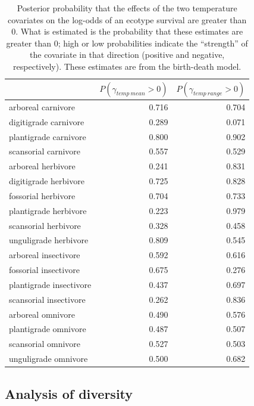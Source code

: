 \documentclass[12pt,letterpaper]{article}
\begin{document}
\begin{table}[ht]
  \centering
  \caption[Posterior probablity of effects of temperature on survival]{Posterior probability that the effects of the two temperature covariates on the log-odds of an ecotype survival are greater than 0. What is estimated is the probability that these estimates are greater than 0; high or low probabilities indicate the ``strength'' of the covariate in that direction (positive and negative, respectively). These estimates are from the birth-death model.}
  \label{tab:surv_temp}
  \begin{tabular}{ l r r }
    \hline
    & \(P(\gamma_{temp\ mean} > 0)\) & \(P(\gamma_{temp\ range} > 0)\) \\ 
    \hline
    arboreal carnivore & 0.716 & 0.704 \\ 
    digitigrade carnivore & 0.289 & 0.071 \\ 
    plantigrade carnivore & 0.800 & 0.902 \\ 
    scansorial carnivore & 0.557 & 0.529 \\ 
    arboreal herbivore & 0.241 & 0.831 \\ 
    digitigrade herbivore & 0.725 & 0.828 \\ 
    fossorial herbivore & 0.704 & 0.733 \\ 
    plantigrade herbivore & 0.223 & 0.979 \\ 
    scansorial herbivore & 0.328 & 0.458 \\ 
    unguligrade herbivore & 0.809 & 0.545 \\ 
    arboreal insectivore & 0.592 & 0.616 \\ 
    fossorial insectivore & 0.675 & 0.276 \\ 
    plantigrade insectivore & 0.437 & 0.697 \\ 
    scansorial insectivore & 0.262 & 0.836 \\ 
    arboreal omnivore & 0.490 & 0.576 \\ 
    plantigrade omnivore & 0.487 & 0.507 \\ 
    scansorial omnivore & 0.527 & 0.503 \\ 
    unguligrade omnivore & 0.500 & 0.682 \\ 
    \hline
  \end{tabular}
\end{table}





\subsection*{Analysis of diversity}
\end{document}
